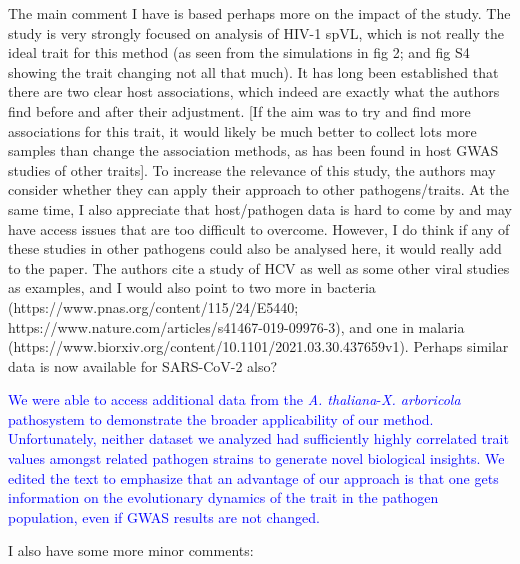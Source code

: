 \documentclass[11pt]{article}
\begin{document}
The main comment I have is based perhaps more on the impact of the study. The study is very strongly focused on analysis of HIV-1 spVL, which is not really the ideal trait for this method (as seen from the simulations in fig 2; and fig S4 showing the trait changing not all that much). It has long been established that there are two clear host associations, which indeed are exactly what the authors find before and after their adjustment. [If the aim was to try and find more associations for this trait, it would likely be much better to collect lots more samples than change the association methods, as has been found in host GWAS studies of other traits]. To increase the relevance of this study, the authors may consider whether they can apply their approach to other pathogens/traits. At the same time, I also appreciate that host/pathogen data is hard to come by and may have access issues that are too difficult to overcome. However, I do think if any of these studies in other pathogens could also be analysed here, it would really add to the paper. The authors cite a study of HCV as well as some other viral studies as examples, and I would also point to two more in bacteria (https://www.pnas.org/content/115/24/E5440; https://www.nature.com/articles/s41467-019-09976-3), and one in malaria (https://www.biorxiv.org/content/10.1101/2021.03.30.437659v1). Perhaps similar data is now available for SARS-CoV-2 also?

\textcolor{blue}{We were able to access additional data from the \emph{A. thaliana}-\emph{X. arboricola} pathosystem to demonstrate the broader applicability of our method. Unfortunately, neither dataset we analyzed had sufficiently highly correlated trait values amongst related pathogen strains to generate novel biological insights. We edited the text to emphasize that an advantage of our approach is that one gets information on the evolutionary dynamics of the trait in  the pathogen population, even if GWAS results are not changed.}

\vspace{5mm}
I also have some more minor comments:
\end{document}
